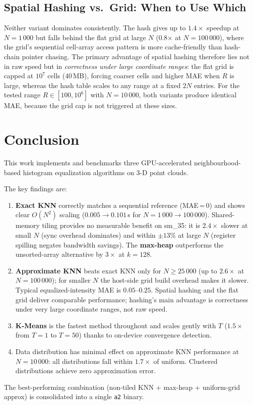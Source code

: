 \documentclass[11pt,a4paper]{article}
\begin{document}
\subsection{Spatial Hashing vs.\ Grid: When to Use Which}

Neither variant dominates consistently.  The hash gives up to $1.4\times$
speedup at $N=1\,000$ but falls behind the flat grid at large $N$ (0.8$\times$
at $N=100\,000$), where the grid's sequential cell-array access pattern is more
cache-friendly than hash-chain pointer chasing.  The primary advantage of
spatial hashing therefore lies not in raw speed but in \emph{correctness under
large coordinate ranges}: the flat grid is capped at $10^7$ cells (40\,MB),
forcing coarser cells and higher MAE when $R$ is large, whereas the hash table
scales to any range at a fixed $2N$ entries.  For the tested range
$R \in [100, 10^6]$ with $N=10\,000$, both variants produce identical MAE,
because the grid cap is not triggered at these sizes.

\section{Conclusion}

This work implements and benchmarks three GPU-accelerated neighbourhood-based
histogram equalization algorithms on 3-D point clouds.

The key findings are:
\begin{enumerate}
  \item \textbf{Exact KNN} correctly matches a sequential reference (MAE\,=\,0)
        and shows clear $O(N^2)$ scaling ($0.005 \to 0.101$\,s for
        $N=1\,000 \to 100\,000$).  Shared-memory tiling provides no measurable
        benefit on sm\_35: it is $2.4\times$ slower at small $N$ (sync
        overhead dominates) and within $\pm13\%$ at large $N$ (register
        spilling negates bandwidth savings).  The \textbf{max-heap} outperforms
        the unsorted-array alternative by $3\times$ at $k=128$.

  \item \textbf{Approximate KNN} beats exact KNN only for $N \ge 25\,000$
        (up to $2.6\times$ at $N=100\,000$); for smaller $N$ the host-side
        grid build overhead makes it slower.  Typical equalized-intensity MAE
        is $0.05$--$0.25$.  Spatial hashing and the flat grid deliver
        comparable performance; hashing's main advantage is correctness
        under very large coordinate ranges, not raw speed.

  \item \textbf{K-Means} is the fastest method throughout and scales gently
        with $T$ ($1.5\times$ from $T=1$ to $T=50$) thanks to on-device
        convergence detection.

  \item Data distribution has minimal effect on approximate KNN performance
        at $N=10\,000$: all distributions fall within $1.7\times$ of uniform.
        Clustered distributions achieve zero approximation error.
\end{enumerate}

The best-performing combination (non-tiled KNN + max-heap + uniform-grid approx)
is consolidated into a single \texttt{a2} binary. 
\end{document}
